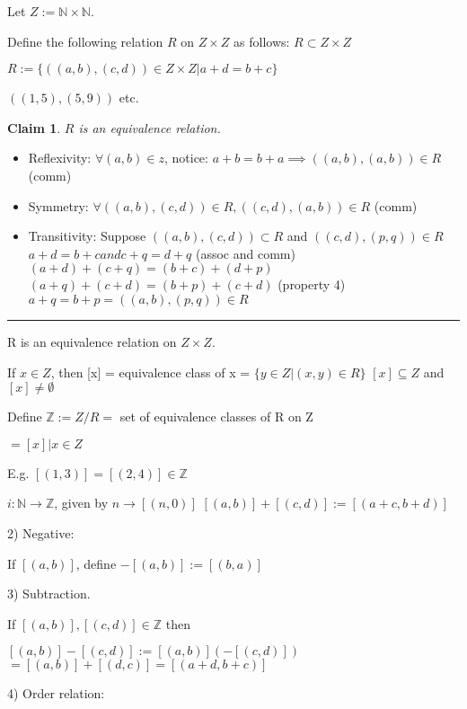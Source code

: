 \documentclass[twoside]{article}
\newcommand{\N}{\mathbb{N}}
\newcommand{\Z}{\mathbb{Z}}
\newtheorem{claim}[theorem]{Claim}
\newenvironment{proof}{{\bf Proof:}}{\hfill\rule{2mm}{2mm}}
\begin{document}
    Let $Z := \N \times \N$. 

    Define the following relation $R$ on $Z \times Z$ as follows: 
    $R \subset Z \times Z$

    $R := \{((a,b),(c,d)) \in Z \times Z \vert a+d = b+c \} $

    $((1,5),(5,9)) $ etc. 

    \begin{claim}
        $R$ is an equivalence relation. 
    \end{claim}
    \begin{proof}
        \begin{itemize}
            \item Reflexivity: $\forall (a,b) \in z$, notice: $a + b = b+a \implies ((a,b),(a,b)) \in R$ (comm)
            \item Symmetry:  $\forall ((a,b),(c,d)) \in R, ((c,d),(a,b)) \in R$ (comm)
            \item Transitivity: Suppose $((a,b),(c,d)) \subset R $ and $((c,d),(p,q)) \in R$
$            a + d = b + c and c + q = d + q
$            (assoc and comm)
$            (a+d) + (c+q) = (b+c) + (d+p)
$ $            (a+q) + (c+d) = (b+p) + (c+d)
$            (property 4)
            $a+q = b+p = ((a,b), (p,q)) \in R$
        \end{itemize}
    \end{proof}

    R is an equivalence relation on $Z \times Z$.

    If $x \in Z$, then [x] = equivalence class of x = $\{y \in Z \vert (x,y) \in R\}$
    $[x] \subseteq Z $ and $ [x] \neq \emptyset$

    Define $\Z := Z/R =$ set of equivalence classes of R on Z 

    $= {[x] \vert x \in Z}$

    E.g. $[(1,3)] = [(2,4)] \in \Z$

    $i : \N \rightarrow \Z$, given by $n \rightarrow [(n,0)]$
    $ [(a,b)] + [(c,d)] := [(a+c, b+d)]$
    
    2) Negative:

    If $[(a,b)]$, define $-[(a,b)] := [(b,a)]$

    3) Subtraction.

    If $[(a,b)], [(c,d)] \in \Z$ then 

    $[(a,b)] - [(c,d)] := [(a,b)] (-[(c,d)])$
$    = [(a,b)] + [(d,c)]
    = [(a+ d, b+c)]$
    
4) Order relation:
\end{document}
